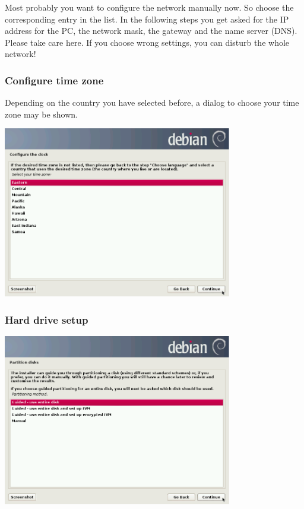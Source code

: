 \documentclass[a4paper,12pt,twoside]{article}
\begin{document}
Most probably you want to configure the network manually now. So choose
the corresponding entry in the list. In the following steps you get
asked for the IP address for the PC, the network mask, the gateway and
the name server (DNS). Please take care here. If you choose wrong
settings, you can disturb the whole network!


\subsubsection{Configure time zone}
\label{sct:inst_timezone}

Depending on the country you have selected before, a dialog to choose
your time zone may be shown.


\begin{minipage}{\linewidth}
    \centering
    \includegraphics[width=10cm]{efaLiveen-img/efaLiveen-img9.png}
    \label{fig:inst_timezone}
\end{minipage}


\subsubsection{Hard drive setup}
\label{sct:inst_harddrive}

\begin{minipage}{\linewidth}
    \centering
    \includegraphics[width=10cm]{efaLiveen-img/efaLiveen-img10.png}
    \label{fig:partitioning}
\end{minipage}
\end{document}
